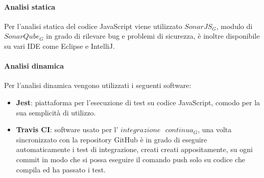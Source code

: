 			\paragraph{Analisi statica} \Spazio
			Per l'analisi statica del codice JavaScript viene utilizzato $SonarJS_G$, modulo di $SonarQube_G$ in grado di rilevare bug e problemi di sicurezza, è inoltre disponibile su vari IDE come Eclipse e IntelliJ.
			\paragraph{Analisi dinamica} \Spazio
			Per l'analisi dinamica vengono utilizzati i seguenti software:
			\begin{itemize}
				\item  \textbf{Jest}: piattaforma per l'esecuzione di test su codice JavaScript, comodo per la sua semplicità di utilizzo.
				\item \textbf{Travis CI}: software usato per l' $integrazione\text{ }continua_G$, una volta sincronizzato con la repository GitHub è in grado di eseguire automaticamente i test di integrazione, creati creati appositamente, su ogni commit in modo che si possa eseguire il comando push solo su codice che compila ed ha passato i test.
			\end{itemize}
